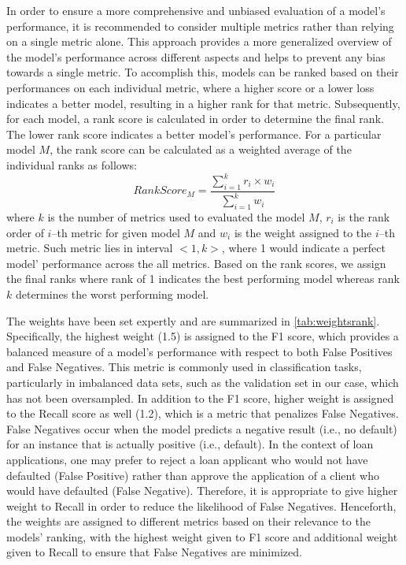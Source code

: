 In order to ensure a more comprehensive and unbiased evaluation of a model's performance, it is recommended to consider multiple metrics rather than relying on a single metric alone. This approach provides a more generalized overview of the model's performance across different aspects and helps to prevent any bias towards a single metric.
To accomplish this, models can be ranked based on their performances on each individual metric, where a higher score or a lower loss indicates a better model, resulting in a higher rank for that metric.
Subsequently, for each model, a rank score is calculated in order to determine the final rank. The lower rank score indicates a better model's performance. For a particular model $M$, the rank score can be calculated as a weighted average of the individual ranks as follows:
\begin{equation}\label{eq:rankscorem}
    RankScore_{M} = \frac{\sum_{i=1}^{k} {r_i \times w_i}}{\sum_{i=1}^{k} {w_i}} 
\end{equation}
where $k$ is the number of metrics used to evaluated the model $M$, $r_i$ is the rank order of $i$--th metric for given model $M$ and $w_i$ is the weight assigned to the $i$--th metric.
Such metric lies in interval $<1, k>$, where 1 would indicate a perfect model' performance across the all metrics.
Based on the rank scores, we assign the final ranks where rank of 1 indicates the best performing model whereas rank $k$ determines the worst performing model.


The weights have been set expertly and are summarized in \autoref{tab:weightsrank}.
Specifically, the highest weight (1.5) is assigned to the F1 score, which provides a balanced measure of a model's performance with respect to both False Positives and False Negatives.
This metric is commonly used in classification tasks, particularly in imbalanced data sets, such as the validation set in our case, which has not been oversampled.
In addition to the F1 score, higher weight is assigned to the Recall score as well (1.2), which is a metric that penalizes False Negatives.
False Negatives occur when the model predicts a negative result (i.e., no default) for an instance that is actually positive (i.e., default).
In the context of loan applications, one may prefer to reject a loan applicant who would not have defaulted (False Positive) rather than approve the application of a client who would have defaulted (False Negative). Therefore, it is appropriate to give higher weight to Recall in order to reduce the likelihood of False Negatives.
Henceforth, the weights are assigned to different metrics based on their relevance to the models' ranking, with the highest weight given to F1 score and additional weight given to Recall to ensure that False Negatives are minimized.

